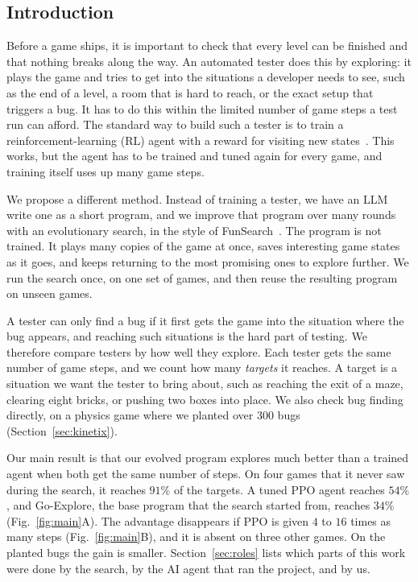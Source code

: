 \documentclass{article}
\begin{document}
\subsection{Introduction}
\label{sec:intro}
Before a game ships, it is important to check that every level can be finished and that nothing breaks along the way. An automated tester does this by exploring: it plays the game and tries to get into the situations a developer needs to
see, such as the end of a level, a room that is hard to reach, or the exact setup that triggers a bug. It has to do
this within the limited number of game steps a test run can afford. The standard way to build such a tester is to train a
reinforcement-learning (RL) agent with a reward for visiting new states~\citep{tang2017,rnd,icm}. This works, but the
agent has to be trained and tuned again for every game, and training itself uses up many game steps.

We propose a different method. Instead of training a tester, we have an LLM write one as a short program, and we improve
that program over many rounds with an evolutionary search, in the style of FunSearch~\citep{funsearch}. The program is
not trained. It plays many copies of the game at once, saves interesting game states as it goes, and keeps returning to
the most promising ones to explore further. We run the search once, on one set of games, and then reuse the resulting
program on unseen games.

A tester can only find a bug if it first gets the game into the situation where the bug appears, and reaching such situations is the hard part of testing. We therefore compare testers by how well they explore. Each tester gets the same number of game steps, and we count how many \emph{targets} it reaches. A target is a situation we want the tester to bring about, such as reaching the exit of a maze, clearing eight bricks, or pushing two boxes into place. We also check bug finding directly, on a physics game where we planted over 300 bugs (Section~\ref{sec:kinetix}).

Our main result is that our evolved program explores much better than a trained agent when both get the same number of
steps. On four games that it never saw during the search, it reaches $91\%$ of the targets. A tuned PPO agent reaches
$54\%$, and Go-Explore, the base program that the search started from, reaches $34\%$ (Fig.~\ref{fig:main}A). The advantage
disappears if PPO is given $4$ to $16$ times as many steps (Fig.~\ref{fig:main}B), and it is absent on three other
games. On the planted bugs the gain is smaller. Section~\ref{sec:roles} lists which parts of this work were done by the
search, by the AI agent that ran the project, and by us.
\end{document}
